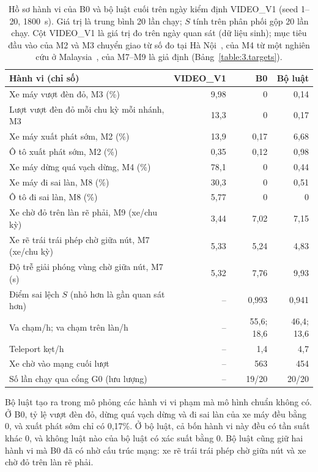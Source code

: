 \documentclass[../main.tex]{subfiles}
\begin{document}
\begin{table}[!htbp]
\centering
\caption{Hồ sơ hành vi của B0 và bộ luật cuối trên ngày kiểm định VIDEO\_V1 (seed 1--20, 1800~s). Giá trị là trung bình 20 lần chạy; $S$ tính trên phân phối gộp 20 lần chạy. Cột VIDEO\_V1 là giá trị đo trên ngày quan sát (dữ liệu sinh); mục tiêu đầu vào của M2 và M3 chuyển giao từ số đo tại Hà Nội~\cite{mai2019signal}, của M4 từ một nghiên cứu ở Malaysia~\cite{zulkiffli2023stopping}, của M7--M9 là giả định (Bảng~\ref{table:3.targets}).}
\label{table:6.profile}
\begin{tabular}{|>{\raggedright\arraybackslash}p{7.2cm}|r|r|r|}
\hline
\textbf{Hành vi (chỉ số)} & \textbf{VIDEO\_V1} & \textbf{B0} & \textbf{Bộ luật} \\ \hline
Xe máy vượt đèn đỏ, M3 (\%) & 9,98 & 0 & 0,14 \\ \hline
Lượt vượt đèn đỏ mỗi chu kỳ mỗi nhánh, M3 & 13,3 & 0 & 0,17 \\ \hline
Xe máy xuất phát sớm, M2 (\%) & 13,9 & 0,17 & 6,68 \\ \hline
Ô tô xuất phát sớm, M2 (\%) & 0,35 & 0,12 & 0,98 \\ \hline
Xe máy dừng quá vạch dừng, M4 (\%) & 78,1 & 0 & 0,44 \\ \hline
Xe máy đi sai làn, M8 (\%) & 30,3 & 0 & 0,51 \\ \hline
Ô tô đi sai làn, M8 (\%) & 5,77 & 0 & 0 \\ \hline
Xe chờ đỏ trên làn rẽ phải, M9 (xe/chu kỳ) & 3,44 & 7,02 & 7,15 \\ \hline
Xe rẽ trái trái phép chờ giữa nút, M7 (xe/chu kỳ) & 5,33 & 5,24 & 4,83 \\ \hline
Độ trễ giải phóng vùng chờ giữa nút, M7 (s) & 5,32 & 7,76 & 9,93 \\ \hline
Điểm sai lệch $S$ (nhỏ hơn là gần quan sát hơn) & -- & 0,993 & 0,941 \\ \hline
Va chạm/h; va chạm trên làn/h & -- & 55,6; 18,6 & 46,4; 13,6 \\ \hline
Teleport kẹt/h & -- & 1,4 & 4,7 \\ \hline
Xe chờ vào mạng cuối lượt & -- & 563 & 454 \\ \hline
Số lần chạy qua cổng G0 (lưu lượng) & -- & 19/20 & 20/20 \\ \hline
\end{tabular}
\end{table}

Bộ luật tạo ra trong mô phỏng các hành vi vi phạm mà mô hình chuẩn không có. Ở B0, tỷ lệ vượt đèn đỏ, dừng quá vạch dừng và đi sai làn của xe máy đều bằng 0, và xuất phát sớm chỉ có 0,17\%. Ở bộ luật, cả bốn hành vi này đều có tần suất khác 0, và không luật nào của bộ luật có xác suất bằng 0. Bộ luật cũng giữ hai hành vi mà B0 đã có nhờ cấu trúc mạng: xe rẽ trái trái phép chờ giữa nút và xe chờ đỏ trên làn rẽ phải.
\end{document}
